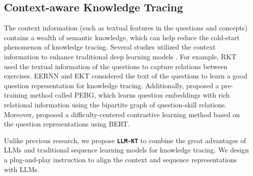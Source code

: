 \subsection{Context-aware Knowledge Tracing}
The context information (such as textual features in the questions and concepts) contains a wealth of semantic knowledge, which can help reduce the cold-start phenomenon of knowledge tracing. 
Several studies utilized the context information to enhance traditional deep learning models \cite{RKT,EERNN}. 
For example, RKT \cite{RKT} used the textual information of the questions to capture relations between exercises. 
EERNN \cite{EERNN} and EKT \cite{EKT} considered the text of the questions to learn a good question representation for knowledge tracing. 
Additionally, \citet{PEBG} proposed a pre-training method called PEBG, which learns question embeddings with rich relational information using the bipartite graph of question-skill relations. 
Moreover, \citet{DCL4KT-A} proposed a difficulty-centered contrastive learning method based on the question representations using BERT. 

Unlike previous research, we propose \texttt{\textbf{LLM-KT}} to combine the great advantages of LLMs and traditional sequence learning models for knowledge tracing. 
We design a plug-and-play instruction to align the context and sequence representations with LLMs.



